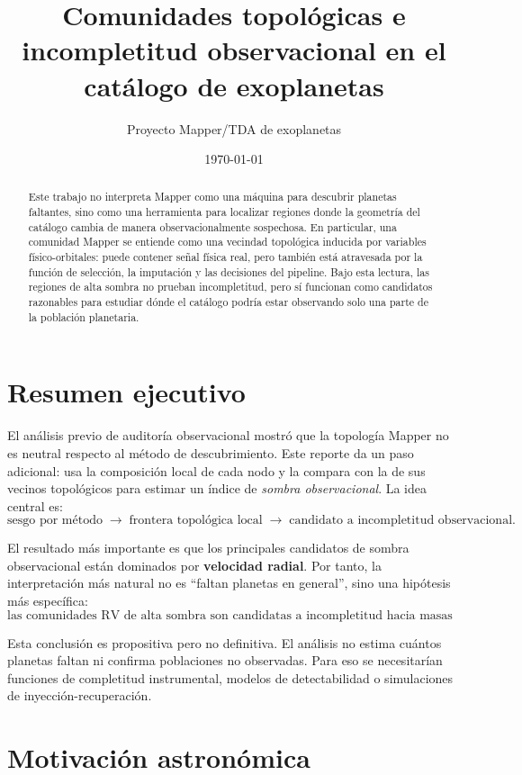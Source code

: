 \documentclass[11pt]{article}
\title{Comunidades topológicas e incompletitud observacional en el catálogo de exoplanetas}
\author{Proyecto Mapper/TDA de exoplanetas}
\date{\today}
\begin{document}
\maketitle

\begin{abstract}
Este trabajo no interpreta Mapper como una máquina para descubrir planetas faltantes, sino como una herramienta para localizar regiones donde la geometría del catálogo cambia de manera observacionalmente sospechosa. En particular, una comunidad Mapper se entiende como una vecindad topológica inducida por variables físico-orbitales: puede contener señal física real, pero también está atravesada por la función de selección, la imputación y las decisiones del pipeline. Bajo esta lectura, las regiones de alta sombra no prueban incompletitud, pero sí funcionan como candidatos razonables para estudiar dónde el catálogo podría estar observando solo una parte de la población planetaria.
\end{abstract}

\section{Resumen ejecutivo}

El análisis previo de auditoría observacional mostró que la topología Mapper no es neutral respecto al método de descubrimiento. Este reporte da un paso adicional: usa la composición local de cada nodo y la compara con la de sus vecinos topológicos para estimar un índice de \emph{sombra observacional}. La idea central es:
\[
\text{sesgo por método} \;\longrightarrow\; \text{frontera topológica local} \;\longrightarrow\; \text{candidato a incompletitud observacional}.
\]

El resultado más importante es que los principales candidatos de sombra observacional están dominados por \textbf{velocidad radial}. Por tanto, la interpretación más natural no es ``faltan planetas en general'', sino una hipótesis más específica:
\[
\boxed{\text{las comunidades RV de alta sombra son candidatas a incompletitud hacia masas menores o señales radiales débiles.}}
\]

Esta conclusión es propositiva pero no definitiva. El análisis no estima cuántos planetas faltan ni confirma poblaciones no observadas. Para eso se necesitarían funciones de completitud instrumental, modelos de detectabilidad o simulaciones de inyección-recuperación.

\section{Motivación astronómica}
\end{document}

